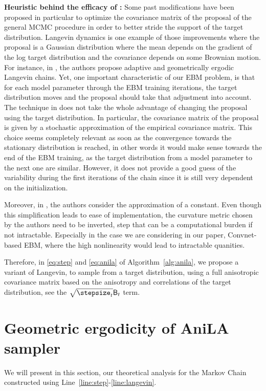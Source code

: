 \documentclass{article}
\begin{document}
\textbf{Heuristic behind the efficacy of \algo:}
Some past modifications have been proposed in particular to optimize the covariance matrix of the proposal of the general MCMC procedure in order to better stride the support of the target distribution. 
Langevin dynamics is one example of those improvements where the proposal is a Gaussian distribution where the mean depends on the gradient of the log target distribution and the covariance depends on some Brownian motion.
For instance, in \citep{atchade2006adaptive,marshall2012adaptive}, the authors propose adaptive and geometrically ergodic Langevin chains. 
Yet, one important characteristic of our EBM problem, is that for each model parameter through the EBM training iterations, the target distribution moves and the proposal should take that adjustment into account.
The technique in \citep{atchade2006adaptive,marshall2012adaptive} does not take the whole advantage of changing the proposal using the target distribution. 
In particular, the covariance matrix of the proposal is given by a stochastic approximation of the empirical covariance matrix. 
This choice seems completely relevant as soon as the convergence towards the stationary distribution is reached, in other words it would make sense towards the end of the EBM training, as the target distribution from a model parameter to the next one are similar. 
However, it does not provide a good guess of the variability during the first iterations of the chain since it is still very dependent on the initialization. 

Moreover, in  \citep{girolami2011riemann}, the authors consider the approximation of a constant. Even though this simplification leads to ease of implementation, the curvature metric chosen by the authors need to be inverted, step that can be a computational burden if not intractable. 
Especially in the case we are considering in our paper, \ie Convnet-based EBM, where the high nonlinearity would lead to intractable quanities.

Therefore, in \eqref{eq:step} and \eqref{eq:anila} of Algorithm~\ref{alg:anila}, we propose a variant of Langevin, to sample from a target distribution, using a full anisotropic covariance matrix based on the anisotropy and correlations of the target distribution, see the $\sqrt{\stepsize_t} \mathsf{B}_t$ term. 


\section{Geometric ergodicity of AniLA sampler}\label{sec:theory}
We will present in this section, our theoretical analysis for the Markov Chain constructed using Line~\ref{line:step}-\ref{line:langevin}. 
\end{document}

